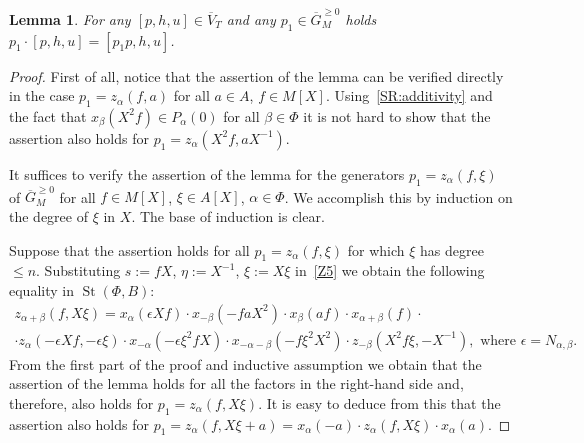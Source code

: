 \documentclass[oneside, 8pt]{amsart}
\newtheorem{lemma}{Lemma}
\theoremstyle{remark}
\theoremstyle{definition}
\numberwithin{lemma}{section}
\numberwithin{prop}{section}
\numberwithin{corollary}{section}
\numberwithin{externaltheorem}{section}
\DeclareMathOperator{\St}{St}
\numberwithin{equation}{section}
\begin{document}
\begin{lemma}\label{lem:action} For any $[p, h, u]\in \overline{V}_T$ and any $p_1 \in \overline{G}^{\geq 0}_M$ holds $p_1 \cdot [p, h, u] = [p_1p, h, u]$. \end{lemma}
\begin{proof} First of all, notice that the assertion of the lemma can be verified directly in the case $p_1 = z_\alpha(f, a)$ for all $a\in A$, $f\in M[X]$. Using~\cref{SR:additivity} and the fact that $x_\beta(X^2f) \in P_\alpha(0)$ for all $\beta \in \Phi$ it is not hard to show that the assertion also holds for $p_1 = z_\alpha(X^2f, aX^{-1})$.

It suffices to verify the assertion of the lemma for the generators $p_1 = z_\alpha(f, \xi)$ of $\overline{G}_M^{\geq 0}$ for all $f \in M[X]$, $\xi\in A[X]$, $\alpha \in \Phi$. We accomplish this by 
induction on the degree of $\xi$ in $X$. The base of induction is clear.

Suppose that the assertion holds for all $p_1 = z_\alpha(f, \xi)$ for which $\xi$ has degree $\leq n$.
Substituting $s := fX$, $\eta := X^{-1}$, $\xi := X\xi$ in~\eqref{Z5} we obtain the following equality in $\St(\Phi, B)$:
\begin{multline*}
 z_{\alpha+\beta}(f, X\xi) = x_\alpha(\epsilon Xf) \cdot x_{-\beta}(-faX^2) \cdot x_{\beta}(af) \cdot x_{\alpha+\beta}(f) \cdot \\ \cdot z_\alpha(-\epsilon Xf, -\epsilon \xi) \cdot x_{-\alpha}(-\epsilon \xi^2fX) \cdot x_{-\alpha-\beta}(- f \xi^2X^2) \cdot z_{-\beta}(X^2f\xi, -X^{-1}),\text{ where $\epsilon = N_{\alpha, \beta}$.}
\end{multline*}
From the first part of the proof and inductive assumption we obtain that the assertion of the lemma holds for all the factors in the right-hand side and, therefore, also holds  for $p_1 = z_\alpha(f, X\xi)$. It is easy to deduce from this that the assertion also holds for $p_1 = z_\alpha(f, X\xi + a) = x_\alpha(-a) \cdot z_\alpha(f, X\xi) \cdot x_\alpha(a)$. 
\end{proof}
\end{document}
